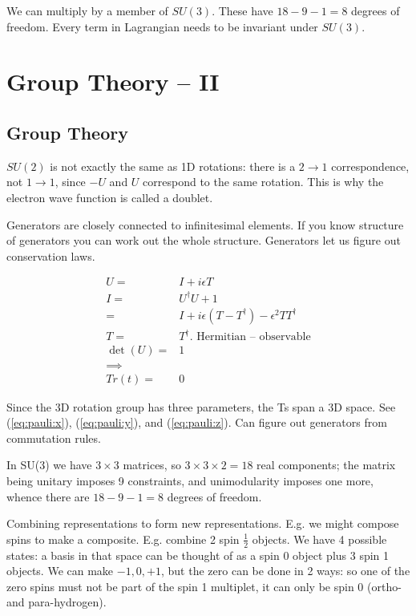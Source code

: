 \documentclass[]{article}
\begin{document}
We can multiply by a member of $SU(3)$. These have $18-9-1=8$ degrees of freedom. Every term in Lagrangian needs to be invariant under $SU(3)$.  


\section{Group Theory – II}

\subsection{Group Theory}
$SU(2)$ is not exactly the same as 1D rotations: there is a $2\rightarrow1$ correspondence, not  $1\rightarrow1$, since $-U$ and $U$ correspond to the same rotation. This is why the electron wave function is called a doublet.

Generators are closely connected to infinitesimal elements. If you know structure of generators you can work out the whole structure. Generators let us figure out conservation laws.

\begin{align*}
	U =& I + i \epsilon T\\
	I =& U^\dagger U + 1\\
	=& I + i\epsilon(T - T^\dagger) - \epsilon^2 T T^\dagger\\
	T =& T^\dagger \text{. Hermitian -- observable}\\
	\det(U) =& 1\\
	\implies&\\
	Tr(t)=&0
\end{align*}

Since the 3D rotation group has three parameters, the Ts span a 3D space. See (\ref{eq:pauli:x}), (\ref{eq:pauli:y}), and (\ref{eq:pauli:z}). Can figure out generators from commutation rules.

In SU(3) we have $3\times3$ matrices, so $3\times3\times2=18$ real components; the matrix being unitary imposes 9 constraints, and unimodularity imposes one more, whence there are $18-9-1=8$ degrees of freedom.

Combining representations to form new representations. E.g. we might compose spins to make a composite. E.g. combine 2 spin $\frac{1}{2}$ objects. We have 4 possible states: a basis in that space can be thought of as a spin 0 object plus 3 spin 1 objects. We can make ${-1,0,+1}$, but the zero can be done in 2 ways: so one of the zero spins must not be part of the spin 1 multiplet, it can only be spin 0 (ortho- and para-hydrogen).
\end{document}
